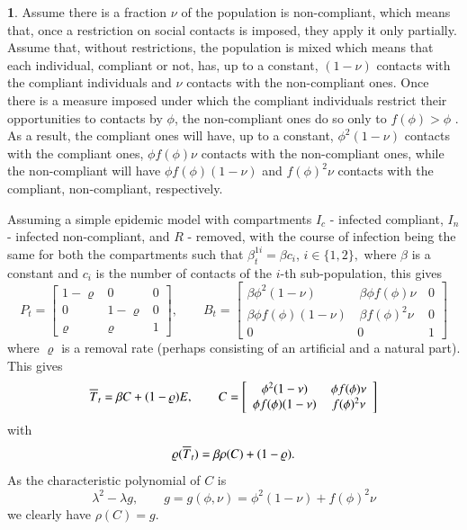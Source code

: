 \documentclass[english]{elsarticle}
\theoremstyle{plain}
\theoremstyle{remark}
\theoremstyle{plain}
\theoremstyle{definition}
\newtheorem{example}[thm]{\protect\examplename}
\providecommand{\examplename}{Example}
\begin{document}
\begin{example}
Assume there is a fraction $\nu$ of the population is non-compliant,
which means that, once a restriction on social contacts is imposed,
they apply it only partially. Assume that, without restrictions, the
population is mixed which means that each individual, compliant or
not, has, up to a constant, $(1-\nu)$ contacts with the compliant
individuals and $\nu$ contacts with the non-compliant ones. Once
there is a measure imposed under which the compliant individuals restrict
their opportunities to contacts by $\phi$, the non-compliant ones
do so only to $f(\phi)>\phi$ . As a result, the compliant ones will
have, up to a constant, $\phi^{2}(1-\nu)$ contacts with the compliant
ones, $\phi f(\phi)\nu$ contacts with the non-compliant ones, while
the non-compliant will have $\phi f(\phi)(1-\nu)$ and $f(\phi)^{2}\nu$
contacts with the compliant, non-compliant, respectively.

Assuming a simple epidemic model with compartments $I_{c}$ - infected
compliant, $I_{n}$ - infected non-compliant, and $R$ - removed,
with the course of infection being the same for both the compartments
such that $\beta_{t}^{1i}=\beta c_{i}$, $i\in\{1,2\},$ where $\beta$
is a constant and $c_{i}$ is the number of contacts of the $i$-th
sub-population, this gives 
\[
P_{t}=\left[\begin{array}{ccc}
1-\varrho & 0 & 0\\
0 & 1-\varrho & 0\\
\varrho & \varrho & 1
\end{array}\right],\qquad B_{t}=\left[\begin{array}{ccc}
\beta\phi^{2}(1-\nu) & \,\beta\phi f(\phi)\nu\, & 0\\
\beta\phi f(\phi)(1-\nu) & \,\beta f(\phi)^{2}\nu\, & 0\\
0 & 0 & 1
\end{array}\right]
\]
where $\varrho$ is a removal rate (perhaps consisting of an artificial
and a natural part). This gives 
\[
\overline{T}_{t}=\beta C+(1-\varrho)E,\qquad C=\left[\begin{array}{cc}
\phi^{2}(1-\nu) & \,\phi f(\phi)\nu\\
\phi f(\phi)(1-\nu) & \,f(\phi)^{2}\nu
\end{array}\right]
\]
with 
\[
\varrho(\overline{T}_{t})=\beta\rho(C)+(1-\varrho).
\]
As the characteristic polynomial of $C$ is 
\[
\lambda^{2}-\lambda g,\qquad g=g(\phi,\nu)=\phi^{2}(1-\nu)+f(\phi)^{2}\nu
\]
we clearly have $\rho(C)=g.$


\end{example}
\end{document}
